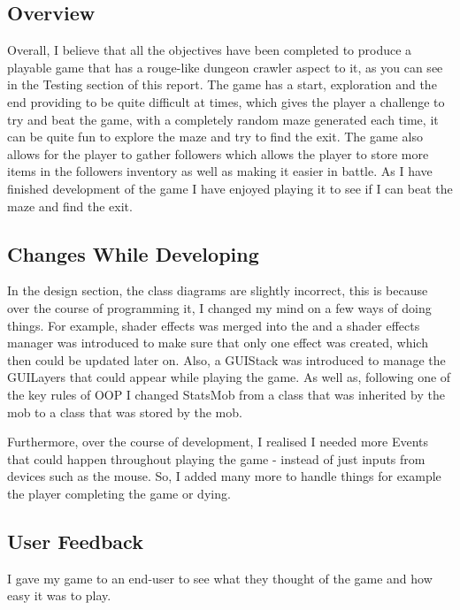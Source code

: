 \documentclass[../Main.tex]{subfiles}
\begin{document}
    \subsection{Overview}
        Overall, I believe that all the objectives have been completed to produce a playable game that has a rouge-like dungeon crawler aspect to it, as you can see in the Testing section of this report. The game has a start, exploration and the end providing to be quite difficult at times, which gives the player a challenge to try and beat the game, with a completely random maze generated each time, it can be quite fun to explore the maze and try to find the exit. The game also allows for the player to gather followers which allows the player to store more items in the followers inventory as well as making it easier in battle. As I have finished development of the game I have enjoyed playing it to see if I can beat the maze and find the exit.
    \subsection{Changes While Developing}
        In the design section, the class diagrams are slightly incorrect, this is because over the course of programming it, I changed my mind on a few ways of doing things. For example, shader effects was merged into the and a shader effects manager was introduced to make sure that only one effect was created, which then could be updated later on. Also, a GUIStack was introduced to manage the GUILayers that could appear while playing the game. As well as, following one of the key rules of OOP I changed StatsMob from a class that was inherited by the mob to a class that was stored by the mob.

        Furthermore, over the course of development, I realised I needed more Events that could happen throughout playing the game - instead of just inputs from devices such as the mouse. So, I added many more to handle things for example the player completing the game or dying.
    \subsection{User Feedback}
        I gave my game to an end-user to see what they thought of the game and how easy it was to play.
\end{document}
